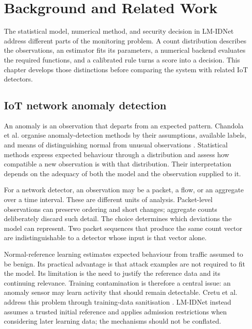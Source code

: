 \chapter{Background and Related Work}
\label{ch:background}

The statistical model, numerical method, and security decision in LM-IDNet
address different parts of the monitoring problem. A count distribution
describes the observations, an estimator fits its parameters, a numerical
backend evaluates the required functions, and a calibrated rule turns a
score into a decision. This chapter develops those distinctions before
comparing the system with related IoT detectors.

\section{IoT network anomaly detection}
\label{sec:background-detection}

An anomaly is an observation that departs from an expected pattern.
Chandola et al. organise anomaly-detection methods by their assumptions,
available labels, and means of distinguishing normal from unusual
observations \cite{chandola2009}. Statistical methods express expected
behaviour through a distribution and assess how compatible a new
observation is with that distribution. Their interpretation depends on
the adequacy of both the model and the observation supplied to it.

For a network detector, an observation may be a packet, a flow, or an
aggregate over a time interval. These are different units of analysis.
Packet-level observations can preserve ordering and short changes;
aggregate counts deliberately discard such detail. The choice determines
which deviations the model can represent. Two packet sequences that
produce the same count vector are indistinguishable to a detector whose
input is that vector alone.

Normal-reference learning estimates expected behaviour from traffic
assumed to be benign. Its practical advantage is that attack examples are
not required to fit the model. Its limitation is the need to justify the
reference data and its continuing relevance. Training contamination is
therefore a central issue: an anomaly sensor may learn activity that should
remain detectable. Cretu et al. address this problem through training-data
sanitisation \cite{cretu2008}. LM-IDNet instead assumes a trusted initial
reference and applies admission restrictions when considering later
learning data; the mechanisms should not be conflated.

